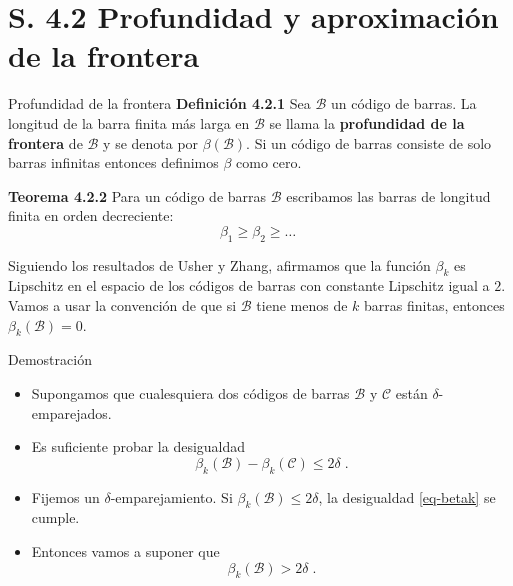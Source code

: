 \documentclass{beamer}
\newcommand{\calB}{{\mathcal{B}}}
\newcommand{\calC}{{\mathcal{C}}}
\begin{document}
\section{S. 4.2 Profundidad y aproximación de la frontera}

\begin{frame}{Profundidad de la frontera}
    \textbf{{\color{cyan}Definición 4.2.1}} Sea $\calB$ un código de barras. La longitud de la barra finita más larga en $\calB$ se llama la \textbf{{\color{green}profundidad de la frontera}} de $\calB$ y se denota por $\beta(\calB)$. \pause
    Si un código de barras consiste de solo barras infinitas entonces definimos $\beta$ como cero. 
\end{frame}

\begin{frame}{}
    \textbf{{\color{cyan}Teorema 4.2.2}} 
    Para un código de barras $\calB$ escribamos las barras de longitud finita en orden decreciente:
	\begin{equation}\label{eq-listbeta}
	\beta_1 \geq \beta_2 \geq \dots\;
	\end{equation} 
 
 Siguiendo los resultados de Usher y Zhang, afirmamos que la función $\beta_k$ es  Lipschitz en el espacio de los códigos de barras con constante Lipschitz igual a $2$. Vamos a usar la convención de que si $\calB$ tiene menos de $k$ barras finitas, entonces $\beta_k(\calB)=0$.
 
\end{frame}

\begin{frame}{Demostración}
\begin{itemize}
    \item Supongamos que cualesquiera dos códigos de barras $\calB$ y $\calC$ están $\delta$-emparejados. \pause
    \item Es suficiente probar la desigualdad
\begin{equation}\label{eq-betak}
\beta_k(\calB) -\beta_k(\calC) \leq 2\delta\;.
\end{equation} \pause
\item Fijemos un $\delta$-emparejamiento. Si $\beta_k(\calB) \leq 2\delta$, la desigualdad \eqref{eq-betak} se cumple. \pause 
\item Entonces vamos a suponer que 
\begin{equation}
\label{eq-betadelta}
\beta_k(\calB) > 2\delta\;.
\end{equation}
\end{itemize}
\end{frame}
\end{document}
